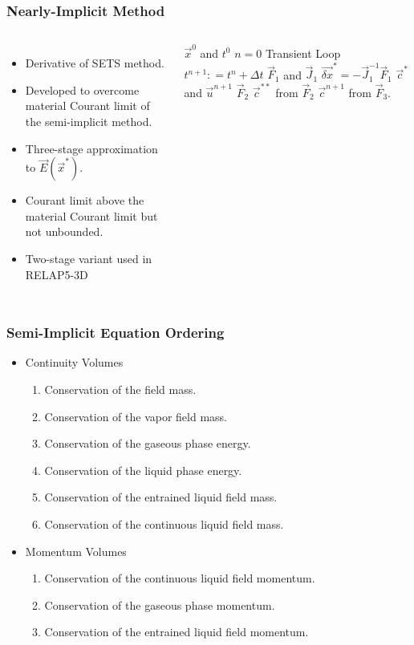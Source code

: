\documentclass[compress,xcolor=table]{beamer}
\begin{document}
\begin{frame}
\frametitle{Nearly-Implicit Method}

\begin{columns}

\begin{itemize}
\item{Derivative of SETS method.}
\item{Developed to overcome material Courant limit of the semi-implicit method.}
\item{Three-stage approximation to $\vec{E}(\vec{x}^{*})$.}
\item{Courant limit above the material Courant limit but not unbounded.}
\item{Two-stage variant used in RELAP5-3D}
\end{itemize}

\begin{algorithmic}
\scriptsize
\Require $\vec{x}^{0}$ and $t^{0}$
\Set $n = 0$
\Loop \; Transient Loop
    \State $t^{n+1} : = t^{n} + \Delta t$
	\Calculate $\vec{F}_1$ and $\vec{J}_1$
	\Calculate $\vec{\delta x}^{*} = -\vec{J}^{-1}_1\vec{F}_1$
	\Calculate $\vec{c}^{*}$ and $\vec{u}^{n+1}$
	\Calculate $\vec{F}_2$
	\Calculate $\vec{c}^{**}$ from $\vec{F}_2$
	\Calculate $\vec{c}^{n+1}$ from $\vec{F}_3$.
\end{algorithmic}

\end{columns}

\end{frame}
\begin{frame}
\frametitle{Semi-Implicit Equation Ordering}

\begin{itemize}
\item{Continuity Volumes
\begin{enumerate}
\item{Conservation of the \ncg{} field mass.}
\item{Conservation of the vapor field mass.}
\item{Conservation of the gaseous phase energy.}
\item{Conservation of the liquid phase energy.}
\item{Conservation of the entrained liquid field mass.}
\item{Conservation of the continuous liquid field mass.}
\end{enumerate}
}
\item{Momentum Volumes
\begin{enumerate}
\item{Conservation of the continuous liquid field momentum.}
\item{Conservation of the gaseous phase momentum.}
\item{Conservation of the entrained liquid field momentum.}
\end{enumerate}
}
\end{itemize}

\end{frame}
\end{document}

